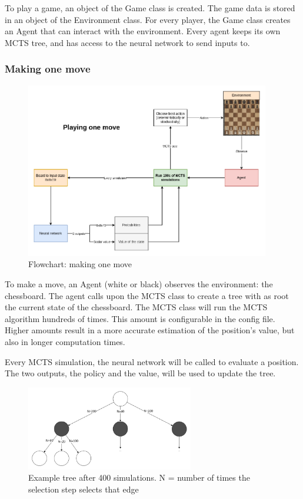 \documentclass{article}
\begin{document}
To play a game, an object of the Game class is created. The game data is stored in an object of the Environment class.
For every player, the Game class creates an Agent that can interact with the environment. Every agent keeps its own 
MCTS tree, and has access to the neural network to send inputs to.

\subsubsection{Making one move}

\begin{figure}[H]
    \centering
    \includegraphics[width=0.95\textwidth]{img/ChessRL-schematic.png}
    \caption{Flowchart: making one move}
\end{figure}

To make a move, an Agent (white or black) observes the environment: the chessboard.
The agent calls upon the MCTS class to create a tree with as root the current state of the chessboard.
The MCTS class will run the MCTS algorithm hundreds of times. This amount is configurable in the config file. 
Higher amounts result in a more accurate estimation of the position's value, but also in longer 
computation times.

Every MCTS simulation, the neural network will be called to evaluate a position. The two outputs, 
the policy and the value, will be used to update the tree. 

\begin{figure}[H]
    \centering
    \includegraphics[width=0.65\textwidth]{img/MCTS-choose-move.png}
    \caption{Example tree after 400 simulations. N = number of times the selection step selects that edge}
\end{figure}
\end{document}
